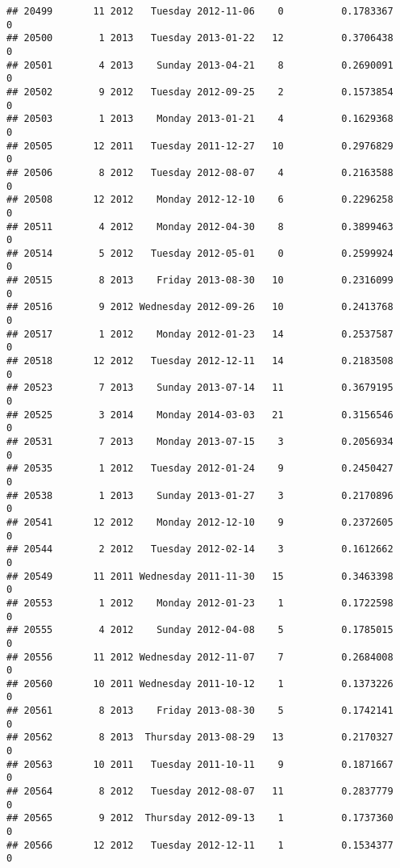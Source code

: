 \documentclass[
]{article}
\begin{document}
\begin{verbatim}
## 20499       11 2012   Tuesday 2012-11-06    0          0.1783367             0
## 20500        1 2013   Tuesday 2013-01-22   12          0.3706438             0
## 20501        4 2013    Sunday 2013-04-21    8          0.2690091             0
## 20502        9 2012   Tuesday 2012-09-25    2          0.1573854             0
## 20503        1 2013    Monday 2013-01-21    4          0.1629368             0
## 20505       12 2011   Tuesday 2011-12-27   10          0.2976829             0
## 20506        8 2012   Tuesday 2012-08-07    4          0.2163588             0
## 20508       12 2012    Monday 2012-12-10    6          0.2296258             0
## 20511        4 2012    Monday 2012-04-30    8          0.3899463             0
## 20514        5 2012   Tuesday 2012-05-01    0          0.2599924             0
## 20515        8 2013    Friday 2013-08-30   10          0.2316099             0
## 20516        9 2012 Wednesday 2012-09-26   10          0.2413768             0
## 20517        1 2012    Monday 2012-01-23   14          0.2537587             0
## 20518       12 2012   Tuesday 2012-12-11   14          0.2183508             0
## 20523        7 2013    Sunday 2013-07-14   11          0.3679195             0
## 20525        3 2014    Monday 2014-03-03   21          0.3156546             0
## 20531        7 2013    Monday 2013-07-15    3          0.2056934             0
## 20535        1 2012   Tuesday 2012-01-24    9          0.2450427             0
## 20538        1 2013    Sunday 2013-01-27    3          0.2170896             0
## 20541       12 2012    Monday 2012-12-10    9          0.2372605             0
## 20544        2 2012   Tuesday 2012-02-14    3          0.1612662             0
## 20549       11 2011 Wednesday 2011-11-30   15          0.3463398             0
## 20553        1 2012    Monday 2012-01-23    1          0.1722598             0
## 20555        4 2012    Sunday 2012-04-08    5          0.1785015             0
## 20556       11 2012 Wednesday 2012-11-07    7          0.2684008             0
## 20560       10 2011 Wednesday 2011-10-12    1          0.1373226             0
## 20561        8 2013    Friday 2013-08-30    5          0.1742141             0
## 20562        8 2013  Thursday 2013-08-29   13          0.2170327             0
## 20563       10 2011   Tuesday 2011-10-11    9          0.1871667             0
## 20564        8 2012   Tuesday 2012-08-07   11          0.2837779             0
## 20565        9 2012  Thursday 2012-09-13    1          0.1737360             0
## 20566       12 2012   Tuesday 2012-12-11    1          0.1534377             0

\end{verbatim}
\end{document}
